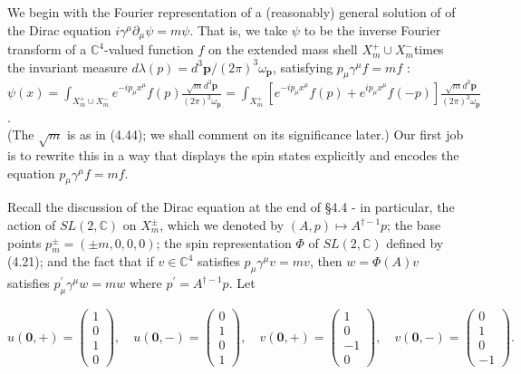 \documentclass[10pt, letterpaper]{article}
\begin{document}
We begin with the Fourier representation of a (reasonably) general solution of of the Dirac equation $i \gamma^{\mu} \partial_{\mu} \psi=m \psi$. That is, we take $\psi$ to be the inverse Fourier\\
transform of a $\mathbb{C}^{4}$-valued function $f$ on the extended mass shell $X_{m}^{+} \cup X_{m}^{-}$times the invariant measure $d \lambda(p)=d^{3} \mathbf{p} /(2 \pi)^{3} \omega_{\mathbf{p}}$, satisfying $p_{\mu} \gamma^{\mu} f=m f$ :\\
$\psi(x)=\int_{X_{m}^{+} \cup X_{m}^{-}} e^{-i p_{\mu} x^{\mu}} f(p) \frac{\sqrt{m} d^{3} \mathbf{p}}{(2 \pi)^{3} \omega_{\mathbf{p}}}=\int_{X_{m}^{+}}\left[e^{-i p_{\mu} x^{\mu}} f(p)+e^{i p_{\mu} x^{\mu}} f(-p)\right] \frac{\sqrt{m} d^{3} \mathbf{p}}{(2 \pi)^{3} \omega_{\mathbf{p}}}$.\\
(The $\sqrt{m}$ is as in (4.44); we shall comment on its significance later.) Our first job is to rewrite this in a way that displays the spin states explicitly and encodes the equation $p_{\mu} \gamma^{\mu} f=m f$.

Recall the discussion of the Dirac equation at the end of §4.4 - in particular, the action of $S L(2, \mathbb{C})$ on $X_{m}^{ \pm}$, which we denoted by $(A, p) \mapsto A^{\dagger-1} p$; the base points $p_{m}^{ \pm}=( \pm m, 0,0,0)$; the spin representation $\Phi$ of $S L(2, \mathbb{C})$ defined by (4.21); and the fact that if $v \in \mathbb{C}^{4}$ satisfies $p_{\mu} \gamma^{\mu} v=m v$, then $w=\Phi(A) v$ satisfies $p_{\mu}^{\prime} \gamma^{\mu} w=m w$ where $p^{\prime}=A^{\dagger-1} p$. Let

$$
u(\mathbf{0},+)=\left(\begin{array}{l}
1 \\
0 \\
1 \\
0
\end{array}\right), \quad u(\mathbf{0},-)=\left(\begin{array}{l}
0 \\
1 \\
0 \\
1
\end{array}\right), \quad v(\mathbf{0},+)=\left(\begin{array}{c}
1 \\
0 \\
-1 \\
0
\end{array}\right), \quad v(\mathbf{0},-)=\left(\begin{array}{c}
0 \\
1 \\
0 \\
-1
\end{array}\right) .
$$
\end{document}
